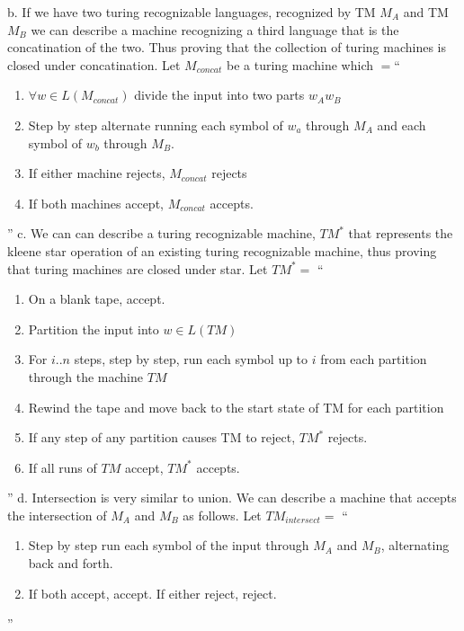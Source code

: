 \begin{problem}{8}
  \begin{solution}
    b. If we have two turing recognizable languages, recognized by TM $M_A$ and TM $M_B$ we can describe a machine
       recognizing a third language that is the concatination of the two. Thus proving that the collection of turing
       machines is closed under concatination.
    \br
    Let $M_{concat}$ be a turing machine which $=$``
      \begin{enumerate}
        \item  $\forall w \in L(M_{concat})$ divide the input into two parts $w_Aw_B$ \\
        \item Step by step alternate running each symbol of $w_a$ through $M_A$ and each symbol of $w_b$ through $M_B$. \\
        \item If either machine rejects, $M_{concat}$ rejects \\
        \item If both machines accept, $M_{concat}$ accepts.
      \end{enumerate}
    ''
    \br
    c. We can can describe a turing recognizable machine, $TM^*$ that represents the kleene star operation of an
       existing turing recognizable machine, thus proving that turing machines are closed under star.
    \br
    Let $TM^* =$ ``
      \begin{enumerate}
        \item On a blank tape, accept. \\
        \item Partition the input into $w \in L(TM)$ \\
        \item For $i..n$ steps, step by step, run each symbol up to $i$ from each partition through the machine $TM$ \\
        \item Rewind the tape and move back to the start state of TM for each partition \\
        \item If any step of any partition causes TM to reject, $TM^*$ rejects. \\
        \item If all runs of $TM$ accept, $TM^*$ accepts.
      \end{enumerate}
    ''
    \br
    d. Intersection is very similar to union. We can describe a machine that accepts the intersection of $M_A$ and $M_B$ as follows.
    \br Let $TM_{intersect} =$ ``
      \begin{enumerate}
        \item Step by step run each symbol of the input through $M_A$ and $M_B$, alternating back and forth. \\
        \item If both accept, accept. If either reject, reject.
      \end{enumerate}
    ''
  \end{solution}
\end{problem}


